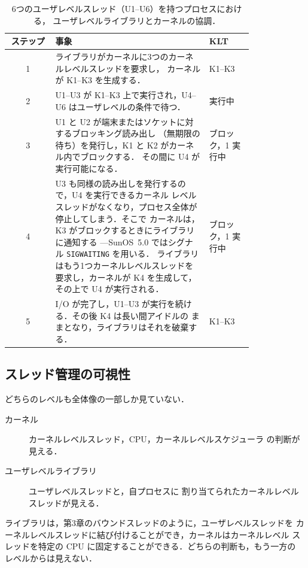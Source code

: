 \documentclass[../main.tex]{subfiles}
\begin{document}
\begin{table}[htbp]
  \centering
  \caption{6つのユーザレベルスレッド（U1--U6）を持つプロセスにおける，
    ユーザレベルライブラリとカーネルの協調．}
  \label{tab:l05-interaction}
  \small
  \begin{tabular}{@{}c>{\raggedright\arraybackslash}p{0.63\linewidth}>{\raggedright\arraybackslash}p{0.18\linewidth}@{}}
    \toprule
    ステップ & 事象 & KLT \\
    \midrule
    1 & ライブラリがカーネルに3つのカーネルレベルスレッドを要求し，
        カーネルが K1--K3 を生成する． & K1--K3 \\
    2 & U1--U3 が K1--K3 上で実行され，U4--U6 はユーザレベルの条件で待つ．
      & 3 実行中 \\
    3 & U1 と U2 が端末またはソケットに対するブロッキング読み出し
        （無期限の待ち）を発行し，K1 と K2 がカーネル内でブロックする．
        その間に U4 が実行可能になる． &
        2 ブロック，1 実行中 \\
    4 & U3 も同様の読み出しを発行するので，U4 を実行できるカーネル
        レベルスレッドがなくなり，プロセス全体が停止してしまう．そこで
        カーネルは，K3 がブロックするときにライブラリに通知する
        ---SunOS~5.0 ではシグナル \texttt{SIGWAITING} を用いる．
        ライブラリはもう1つカーネルレベルスレッドを要求し，カーネルが
        K4 を生成して，その上で U4 が実行される． &
        3 ブロック，1 実行中 \\
    5 & I/O が完了し，U1--U3 が実行を続ける．その後 K4 は長い間アイドルの
        ままとなり，ライブラリはそれを破棄する． & K1--K3 \\
    \bottomrule
  \end{tabular}
\end{table}

\subsection{スレッド管理の可視性}

どちらのレベルも全体像の一部しか見ていない．
\begin{description}
  \item[カーネル] カーネルレベルスレッド，CPU，カーネルレベルスケジューラ
    の判断が見える．
  \item[ユーザレベルライブラリ] ユーザレベルスレッドと，自プロセスに
    割り当てられたカーネルレベルスレッドが見える．
\end{description}
ライブラリは，第3章のバウンドスレッドのように，ユーザレベルスレッドを
カーネルレベルスレッドに結び付けることができ，カーネルはカーネルレベル
スレッドを特定の CPU に固定することができる．どちらの判断も，もう一方の
レベルからは見えない．
\end{document}
